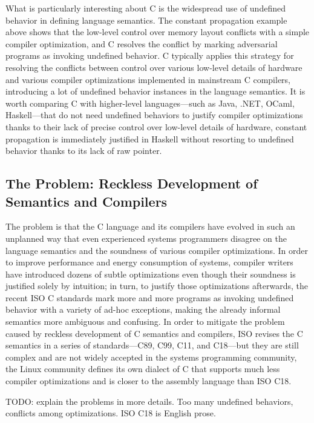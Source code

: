 What is particularly interesting about C is the widespread use of undefined behavior in defining
language semantics.  The constant propagation example above shows that the low-level control over
memory layout conflicts with a simple compiler optimization, and C resolves the conflict by marking
adversarial programs as invoking undefined behavior.  C typically applies this strategy for
resolving the conflicts between control over various low-level details of hardware and various
compiler optimizations implemented in mainstream C compilers, introducing a lot of undefined
behavior instances in the language semantics.  It is worth comparing C with higher-level
languages---such as Java, .NET, OCaml, Haskell---that do not need undefined behaviors to justify
compiler optimizations thanks to their lack of precise control over low-level details of hardware,
\eg{} constant propagation is immediately justified in Haskell without resorting to undefined
behavior thanks to its lack of raw pointer.


\subsection{The Problem: Reckless Development of Semantics and Compilers}

The problem is that the C language and its compilers have evolved in such an unplanned way that even
experienced systems programmers disagree on the language semantics and the soundness of various
compiler optimizations.  In order to improve performance and energy consumption of systems, compiler
writers have introduced dozens of subtle optimizations even though their soundness is justified
solely by intuition; in turn, to justify those optimizations afterwards, the recent ISO C standards
mark more and more programs as invoking undefined behavior with a variety of ad-hoc exceptions,
making the already informal semantics more ambiguous and confusing.  In order to mitigate the
problem caused by reckless development of C semantics and compilers, ISO revises the C semantics in
a series of standards---C89, C99, C11, and C18---but they are still complex and are not widely
accepted in the systems programming community, \eg{} the Linux community defines its own dialect of
C that supports much less compiler optimizations and is closer to the assembly language than ISO
C18.

TODO: explain the problems in more details.  Too many undefined behaviors, conflicts among
optimizations.  ISO C18 is English prose.


